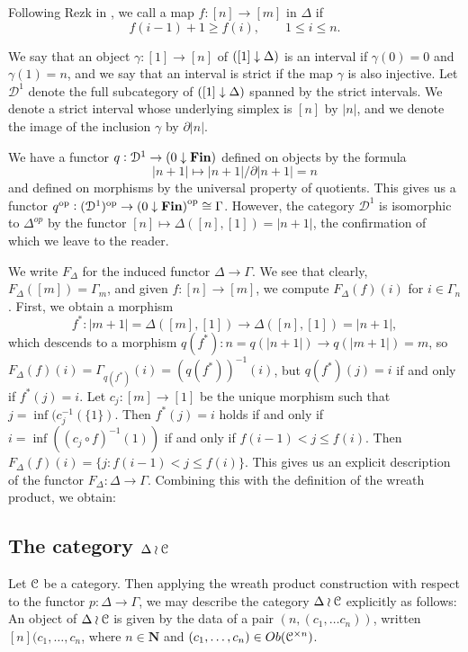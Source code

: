 Following Rezk in \cite{rezk-theta-n-spaces}, we call a map \(f \colon [n]\to [m]\) in \(\Delta\)  if 
\[
f(i-1)+1 \geq f(i),\qquad \text{\(1\leq i \leq n\)}.
\]

We say that an object \(\gamma:[1]\to [n]\) of \({([1]\downarrow \Delta)}\) is an interval if \(\gamma(0)=0\) and \(\gamma(1)=n\), and we say that an interval is strict if the map \(\gamma\) is also injective.  Let \(\mathcal{D}^1\) denote the full subcategory of \({([1]\downarrow \Delta)}\) spanned by the strict intervals.  We denote a strict interval whose underlying simplex is \([n]\) by \(|n|\), and we denote the image of the inclusion \(\gamma\) by \(\partial |n|\).  

We have a functor \(q:\mathcal{D}^1\to {(0\downarrow {\operatorname{\mathbf{Fin}}})}\) defined on objects by the formula \[|n+1|\mapsto |n+1|/\partial|n+1|=n\] and defined on morphisms by the universal property of quotients.  This gives us a functor \(q^{\operatorname{op}}:  (\mathcal{D}^1)^{\operatorname{op}} \to {(0\downarrow {\operatorname{\mathbf{Fin}}})}^{\operatorname{op}}\cong \Gamma\).  However, the category \(\mathcal{D}^1\) is isomorphic to \(\Delta^{op}\) by the functor \([n]\mapsto \Delta([n],[1])=|n+1|\), the confirmation of which we leave to the reader.  

\label{segfun}We write \(F_\Delta\) for the induced functor \(\Delta\to \Gamma\).  We see that clearly, \(F_\Delta([m])=\Gamma_m\), and given \(f:[n]\to [m]\), we compute \(F_\Delta(f)(i)\) for \(i\in \Gamma_n\).  First, we obtain a morphism \[f^\ast:|m+1|=\Delta([m],[1])\to \Delta([n],[1])=|n+1|,\] which descends to a morphism \(q(f^\ast):n=q(|n+1|)\to q(|m+1|)=m\), so \(F_\Delta(f)(i)=\Gamma_{q(f^\ast)}(i)=(q(f^\ast))^{-1}(i)\), but \(q(f^{\ast})(j) = i\) if and only if \(f^\ast(j)=i\).  Let \(c_j:[m]\to [1]\) be the unique morphism such that \(j=\inf(c_j^{-1}(\{1\})\).  Then \(f^\ast(j)=i\) holds if and only if \(i=\inf((c_j\circ f)^{-1}(1))\) if and only if \(f(i-1)<j\leq f(i)\).  Then \(F_\Delta(f)(i)=\{j: f(i-1)<j\leq f(i)\}\).  This gives us an explicit description of the functor \(F_\Delta:\Delta\to \Gamma\).  Combining this with the definition of the wreath product, we obtain:

\subsection{The category $\Delta \wr \mathcal{C}$}

Let \(\mathcal{C}\) be a category.  Then applying the wreath product construction with respect to the functor \(p\colon\Delta\to \Gamma\), we may describe the category \(\Delta \wr \mathcal{C}\) explicitly as follows: An object of \(\Delta \wr \mathcal{C}\) is given by the data of a pair \((n,(c_1,\dots c_n))\), written \([n](c_1,\dots,c_n\), 
where \(n\in \mathbf{N}\) and \((c_1,\dots,c_n) \in Ob(\mathcal{C}^{\times n})\).  

